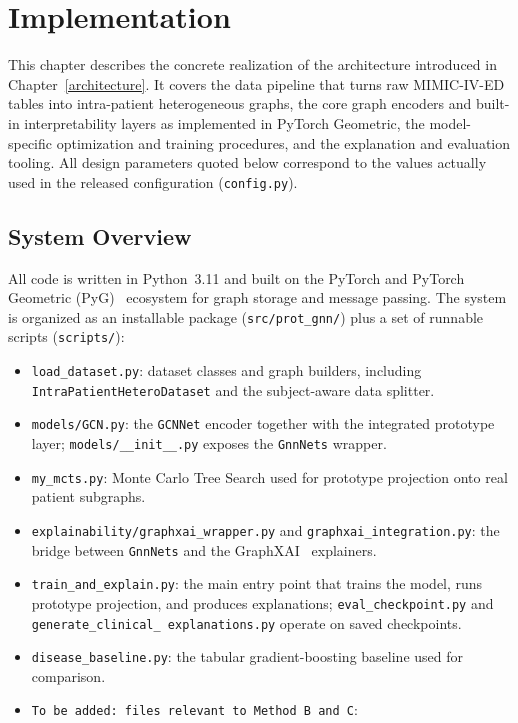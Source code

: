 \chapter{Implementation}\label{implementation}

This chapter describes the concrete realization of the architecture introduced
in Chapter~\ref{architecture}. It covers the data pipeline that turns raw
MIMIC-IV-ED tables into intra-patient heterogeneous graphs, the core graph encoders and built-in interpretability layers as implemented in PyTorch Geometric, the model-specific optimization and training procedures, and the explanation and evaluation
tooling. All design parameters quoted below correspond to the values actually
used in the released configuration (\texttt{config.py}).

\section{System Overview}

All code is written in Python~3.11 and built on the PyTorch and PyTorch
Geometric (PyG)~\cite{fey2019pyg} ecosystem for graph storage and message passing. The
system is organized as an installable package (\texttt{src/prot\_gnn/}) plus a
set of runnable scripts (\texttt{scripts/}):

\begin{itemize}
  \item \texttt{load\_dataset.py}: dataset classes and graph builders,
        including \texttt{IntraPatientHeteroDataset} and the
        subject-aware data splitter.
  \item \texttt{models/GCN.py}: the \texttt{GCNNet} encoder together with the
        integrated prototype layer; \texttt{models/\_\_init\_\_.py} exposes the
        \texttt{GnnNets} wrapper.
  \item \texttt{my\_mcts.py}: Monte Carlo Tree Search used for prototype
        projection onto real patient subgraphs.
  \item \texttt{explainability/graphxai\_wrapper.py} and
        \texttt{graphxai\_integration.py}: the bridge between
        \texttt{GnnNets} and the GraphXAI~\cite{agarwal2023graphxai} explainers.
  \item \texttt{train\_and\_explain.py}: the main entry point that trains the
        model, runs prototype projection, and produces explanations;
        \texttt{eval\_checkpoint.py} and \texttt{generate\_clinical\_%
        explanations.py} operate on saved checkpoints.
  \item \texttt{disease\_baseline.py}: the tabular gradient-boosting baseline used for comparison.
  \item \texttt{To be added: files relevant to Method B and C}:
\end{itemize}

